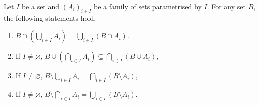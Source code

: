 \begin{propositionenv}
Let \( I \) be a set and \( (A_i)_{i \in I} \) be a family of sets parametrised by \( I \). For any set \( B \),  the following statements hold.
\begin{enumerate}
    \item \( B \cap \left( \bigcup_{i \in I} A_i \right) = \bigcup_{i \in I} (B \cap A_i) \).
    \item If \( I \neq \varnothing \),  \( B \cup \left( \bigcap_{i \in I} A_i \right) \subseteq \bigcap_{i \in I} (B \cup A_i) \), 
    \item If \( I \neq \varnothing \),  \( B \setminus \bigcup_{i \in I} A_i = \bigcap_{i \in I} (B \setminus A_i) \), 
    \item If \( I \neq \varnothing \),  \( B \setminus \bigcap_{i \in I} A_i = \bigcup_{i \in I} (B \setminus A_i) \).
\end{enumerate}
\end{propositionenv}

